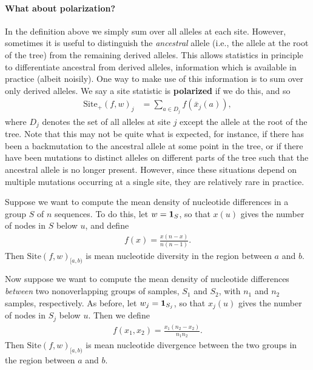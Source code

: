 \documentclass{article}
\newcommand{\site}{\mbox{Site}} %
\newcommand{\sitep}{\mbox{Site}_+} %
\newcommand{\iw}{w} %
\newcommand{\nw}{x} %
\newcommand{\aw}{{\bar x}} %
\begin{document}
\paragraph{What about polarization?}
In the definition above we simply sum over all alleles at each site.
However, sometimes it is useful to distinguish the \emph{ancestral} allele 
(i.e., the allele at the root of the tree) from the remaining derived alleles.
This allows statistics in principle to differentiate ancestral from derived alleles,
information which is available in practice (albeit noisily).
One way to make use of this information is to sum over only derived alleles.
We say a site statistic is \textbf{polarized} if we do this,
and so
\begin{align} \label{eqn:site_unpolarized}
    \sitep(f, \iw)_j
    &=
    \sum_{a \in D_j} f(\aw_j(a)) ,
\end{align}
where $D_j$ denotes the set of all alleles at site $j$ except the allele at the root of the tree.
Note that this may not be quite what is expected,
for instance, if there has been a backmutation to the ancestral allele at some point in the tree,
or if there have been mutations to distinct alleles on different parts of the tree
such that the ancestral allele is no longer present.
However, since these situations depend on multiple mutations occurring at a single site,
they are relatively rare in practice.

\begin{example} \label{ex:site_diversity}
    Suppose we want to compute the mean density of nucleotide differences
    in a group $S$ of $n$ sequences.
    To do this, 
    let $\iw = \bone_S$,
    so that $\nw(u)$ gives the number of nodes in $S$ below $u$,
    and define
    \begin{align*}
        f(x) = \frac{x (n - x)}{n (n-1)} .
    \end{align*}
    Then $\site(f, \iw)_{[a,b)}$ is mean nucleotide diversity in the region between $a$ and $b$.
\end{example}

\begin{example} \label{ex:site_divergence}
    Now suppose we want to compute the mean density of nucleotide differences
    \emph{between} two nonoverlapping groups of samples, $S_1$ and $S_2$,
    with $n_1$ and $n_2$ samples, respectively.
    As before, 
    let $\iw_j = \bone_{S_j}$,
    so that $\nw_{j}(u)$ gives the number of nodes in $S_j$ below $u$.
    Then we define
    \begin{align*}
        f(x_1, x_2) = \frac{x_1 (n_2 - x_2)}{n_1 n_2} .
    \end{align*}
    Then $\site(f, \iw)_{[a,b)}$ is mean nucleotide divergence between the two groups
    in the region between $a$ and $b$.
\end{example}
\end{document}
